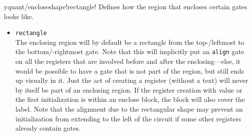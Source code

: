 \documentclass{scrartcl}
\makeatletter
\let\unpatched@minted@inline@iii=\minted@inline@iii%
\def\patched@minted@inline@iii#1{%
      \unpatched@minted@inline@iii{#1}%
      \par%
      \endgroup\egroup\nopagebreak\vskip-\parskip\nopagebreak%
      \noindent\ignorespaces%
   }
\def\patch@mintinline{%
      \let\minted@inline@iii=\patched@minted@inline@iii%
   }
\let\unpatched@RobustMintInlineProcess@ii=\RobustMintInlineProcess@ii
\def\patched@RobustMintInlineProcess@ii#1{%
      \unpatched@RobustMintInlineProcess@ii{#1}%
      \par%
      \endgroup\egroup\nopagebreak\vskip-\parskip\nopagebreak%
      \noindent\ignorespaces%
   }
\def\patch@mintinline{%
      \let\RobustMintInlineProcess@ii=\patched@RobustMintInlineProcess@ii%
   }
\newenvironment{option*}[3][]{\ifhmode\par\fi\addvspace{5mm}%
   \vbox\bgroup\begingroup%
      \patch@mintinline%
      \raggedleft%
      \hspace*{-1cm}%
      \phantomsection\label{yquant:/#2/#3}%
      \texttt{\ifstrempty{#1}\relax{\compat{#1}}\textcolor{gray}{/#2/}\textcolor{mintgreen}{#3}}\hfill default: %
      \tex}{\par\addvspace{5mm}}
\def\ttlink{\link\texttt}
\makeatother
\begin{document}
            \begin{option*}{yquant/enclose}{shape}!rectangle!
               Defines how the region that encloses certain gates looks like.

               \begin{itemize}
                  \item {}\texttt{rectangle} \\
                     The enclosing region will by default be a rectangle from the top-/leftmost to the bottom/-rightmost gate.
                     Note that this will implicitly put an \ttlink{align} gate on all the registers that are involved before and after the enclosing---else, it would be possible to have a gate that is not part of the region, but still ends up visually in it.
                     Just the act of creating a register (without a text) will never by itself be part of an enclosing region.
                     If the register creation with value or the first initialization is within an enclose block, the block will also cover the label.
                     Note that the alignment due to the rectangular shape may prevent an initialization from extending to the left of the circuit if some other registers already contain gates.


\end{itemize}
\end{option*}
\end{document}
